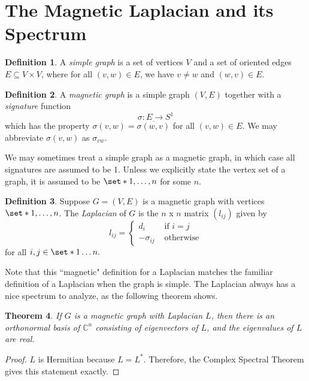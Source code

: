 \documentclass[12pt]{article}
\newtheorem{thm}{Theorem}
\theoremstyle{definition}
\newtheorem{defn}[thm]{Definition}
\newcommand{\C}{\mathbb C}
\begin{document}
\section{The Magnetic Laplacian and its Spectrum}

\begin{defn}
A \textit{simple graph} is a set of vertices $V$ and a set of oriented edges $E \subseteq V \times V$, where for all $(v, w) \in E$, we have $v \neq w$ and $(w, v) \in E$.
\end{defn}

\begin{defn}
A \textit{magnetic graph} is a simple graph $(V, E)$ together with a \textit{signature} function $$\sigma : E \rightarrow S^1$$ which has the property $\sigma(v, w) = \overline{\sigma(w,v)}$ for all $(v, w) \in E$. We may abbreviate $\sigma(v, w)$ as $\sigma_{vw}$.
\end{defn}

We may sometimes treat a simple graph as a magnetic graph, in which case all signatures are assumed to be 1. Unless we explicitly state the vertex set of a graph, it is assumed to be $\set*{1, \dots, n}$ for some $n$.

\begin{defn}
Suppose $G=(V, E)$ is a magnetic graph with vertices $\set*{1, \dots, n}$. The \textit{Laplacian} of $G$ is the $n$ x $n$ matrix $(l_{ij})$ given by 
$$
l_{ij} =
\begin{cases}
d_i &\mbox{ if } i=j \\
-\sigma_{ij} &\mbox{ otherwise}
\end{cases}
$$
for all $i, j \in \set*{1 \dots n}.$
\end{defn}

Note that this ``magnetic" definition for a Laplacian matches the familiar definition of a Laplacian when the graph is simple. The Laplacian always has a nice spectrum to analyze, as the following theorem shows.

\begin{thm}\label{spectral thm applied to Laplacian}
If $G$ is a magnetic graph with Laplacian $L$, then there is an orthonormal basis of $\C^n$ consisting of eigenvectors of $L$, and the eigenvalues of $L$ are real.
\end{thm}
\begin{proof}
$L$ is Hermitian because $L = L^*$. Therefore, the Complex Spectral Theorem gives this statement exactly.
\end{proof}
\end{document}
